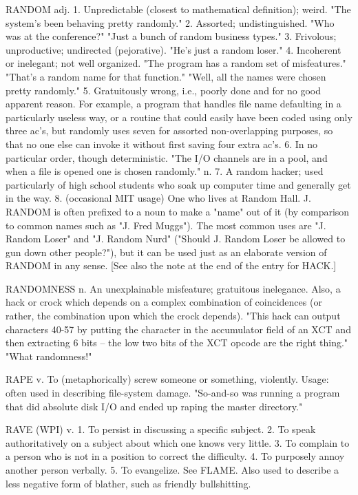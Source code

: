 RANDOM adj. 1. Unpredictable (closest to mathematical definition);
   weird.  "The system's been behaving pretty randomly."  2. Assorted;
   undistinguished.  "Who was at the conference?"  "Just a bunch of
   random business types."  3.	Frivolous; unproductive; undirected
   (pejorative).  "He's just a random loser."  4. Incoherent or
   inelegant; not well organized.  "The program has a random set of
   misfeatures."  "That's a random name for that function."  "Well,
   all the names were chosen pretty randomly."	5. Gratuitously wrong,
   i.e., poorly done and for no good apparent reason.  For example, a
   program that handles file name defaulting in a particularly useless
   way, or a routine that could easily have been coded using only
   three ac's, but randomly uses seven for assorted non-overlapping
   purposes, so that no one else can invoke it without first saving
   four extra ac's.  6. In no particular order, though deterministic.
   "The I/O channels are in a pool, and when a file is opened one is
   chosen randomly."  n. 7. A random hacker; used particularly of high
   school students who soak up computer time and generally get in the
   way.	 8. (occasional MIT usage) One who lives at Random Hall.
   J. RANDOM is often prefixed to a noun to make a "name" out of it
   (by comparison to common names such as "J. Fred Muggs").  The most
   common uses are "J. Random Loser" and "J. Random Nurd" ("Should
   J. Random Loser be allowed to gun down other people?"), but it
   can be used just as an elaborate version of RANDOM in any sense.
   [See also the note at the end of the entry for HACK.]

RANDOMNESS n. An unexplainable misfeature; gratuitous inelegance.
   Also, a hack or crock which depends on a complex combination
   of coincidences (or rather, the combination upon which the
   crock depends).  "This hack can output characters 40-57 by
   putting the character in the accumulator field of an XCT and
   then extracting 6 bits -- the low two bits of the XCT opcode
   are the right thing."  "What randomness!"

RAPE v. To (metaphorically) screw someone or something, violently.
   Usage: often used in describing file-system damage.	"So-and-so was
   running a program that did absolute disk I/O and ended up raping
   the master directory."

RAVE (WPI) v. 1. To persist in discussing a specific subject.  2. To
   speak authoritatively on a subject about which one knows very
   little.  3. To complain to a person who is not in a position to
   correct the difficulty.  4. To purposely annoy another person
   verbally.  5. To evangelize.	 See FLAME.  Also used to describe
   a less negative form of blather, such as friendly bullshitting.

